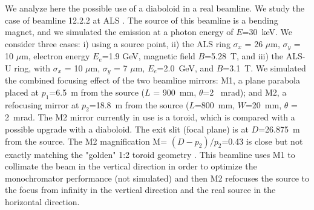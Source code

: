 \documentclass{iucr}              %
\begin{document}
We analyze here the possible use of a diaboloid in a real beamline. We study the case of beamline 12.2.2  at ALS \cite{bl1222} \cite{MacDowell2004}. The source of this beamline is a bending magnet, and we simulated the emission at a photon energy of $E$=30~keV. We consider three cases: i) using a source point, ii) the ALS ring
$\sigma_x$ = 26 $\mu$m, $\sigma_y$ = 10 $\mu$m, electron energy $E_e$=1.9 GeV, magnetic field $B$=5.28~T, and iii) the ALS-U ring, with $\sigma_x$ = 10 $\mu$m, $\sigma_y$ = 7 $\mu$m, $E_e$=2.0~GeV, and $B$=3.1~T. We simulated the combined focusing effect of the two beamline mirrors: M1, a plane parabola placed at $p_1$=6.5~m from the source ($L$ = 900~mm, $\theta$=2 ~mrad); and M2, a refocusing mirror at $p_2$=18.8~m from the source ($L$=800~mm, $W$=20~mm, $\theta$ = 2~mrad. The M2 mirror currently in use is a toroid, which is compared with a possible upgrade with a diaboloid. The exit slit (focal plane) is at $D$=26.875~m from the source.  The M2 magnification M= $(D-p_2)/p_2$=0.43 is close but not exactly matching the "golden" 1:2 toroid geometry \cite{MacDowell2004}. This beamline uses M1 to collimate the beam in the vertical direction in order to optimize the monochromator performance (not simulated) and then 
M2 refocuses the source to the focus from infinity in the vertical direction and the real source in the horizontal direction.


\end{document}
